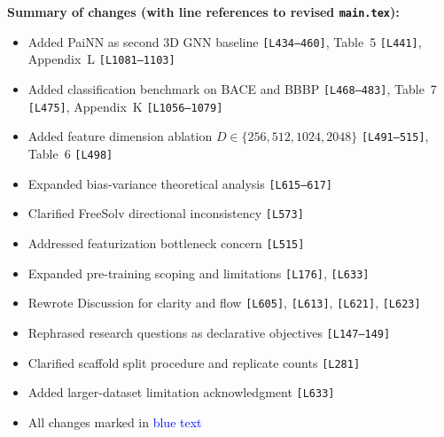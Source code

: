 \documentclass[11pt]{article}
\newcommand{\lines}[1]{\texttt{[L#1]}}
\begin{document}
\noindent\textbf{Summary of changes (with line references to revised \texttt{main.tex}):}
\begin{itemize}[itemsep=2pt]
    \item Added PaiNN as second 3D GNN baseline \lines{434--460}, Table~5 \lines{441}, Appendix~L \lines{1081--1103}
    \item Added classification benchmark on BACE and BBBP \lines{468--483}, Table~7 \lines{475}, Appendix~K \lines{1056--1079}
    \item Added feature dimension ablation $D \in \{256, 512, 1024, 2048\}$ \lines{491--515}, Table~6 \lines{498}
    \item Expanded bias-variance theoretical analysis \lines{615--617}
    \item Clarified FreeSolv directional inconsistency \lines{573}
    \item Addressed featurization bottleneck concern \lines{515}
    \item Expanded pre-training scoping and limitations \lines{176}, \lines{633}
    \item Rewrote Discussion for clarity and flow \lines{605}, \lines{613}, \lines{621}, \lines{623}
    \item Rephrased research questions as declarative objectives \lines{147--149}
    \item Clarified scaffold split procedure and replicate counts \lines{281}
    \item Added larger-dataset limitation acknowledgment \lines{633}
    \item All changes marked in \textcolor{blue}{blue text}
\end{itemize}
\end{document}
